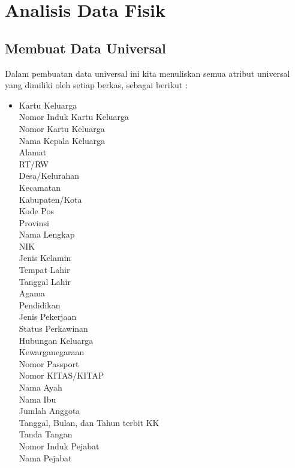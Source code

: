 \chapter{Analisis Data Fisik}

\section{Membuat Data Universal}
Dalam pembuatan data universal ini kita menuliskan semua atribut universal yang dimiliki oleh setiap berkas, sebagai berikut :
\begin{itemize}

	\item Kartu Keluarga\\
		Nomor Induk Kartu Keluarga\\
		Nomor Kartu Keluarga\\
		Nama Kepala Keluarga\\
		Alamat\\
		RT/RW\\
		Desa/Kelurahan\\
		Kecamatan\\
		Kabupaten/Kota\\
		Kode Pos\\
		Provinsi\\
		Nama Lengkap\\
		NIK\\
		Jenis Kelamin\\
		Tempat Lahir\\
		Tanggal Lahir\\
		Agama\\
		Pendidikan\\
		Jenis Pekerjaan\\
		Status Perkawinan\\
		Hubungan Keluarga\\
		Kewarganegaraan\\
		Nomor Passport\\
		Nomor KITAS/KITAP\\
		Nama Ayah\\
		Nama Ibu\\
		Jumlah Anggota\\
		Tanggal, Bulan, dan Tahun terbit KK\\
		Tanda Tangan\\
		Nomor Induk Pejabat\\
		Nama Pejabat


\end{itemize}
